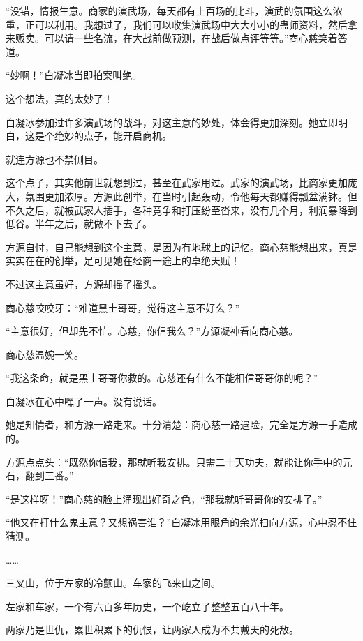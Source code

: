 
\begin{this_body}

“没错，情报生意。商家的演武场，每天都有上百场的比斗，演武的氛围这么浓重，正可以利用。我想过了，我们可以收集演武场中大大小小的蛊师资料，然后拿来贩卖。可以请一些名流，在大战前做预测，在战后做点评等等。”商心慈笑着答道。

“妙啊！”白凝冰当即拍案叫绝。

这个想法，真的太妙了！

白凝冰参加过许多演武场的战斗，对这主意的妙处，体会得更加深刻。她立即明白，这是个绝妙的点子，能开启商机。

就连方源也不禁侧目。

这个点子，其实他前世就想到过，甚至在武家用过。武家的演武场，比商家更加庞大，氛围更加浓厚。方源此创举，在当时引起轰动，令他每天都赚得瓢盆满钵。但不久之后，就被武家人插手，各种竞争和打压纷至沓来，没有几个月，利润暴降到低谷。半年之后，就做不下去了。

方源自忖，自己能想到这个主意，是因为有地球上的记忆。商心慈能想出来，真是实实在在的创举，足可见她在经商一途上的卓绝天赋！

不过这主意虽好，方源却摇了摇头。

商心慈咬咬牙：“难道黑土哥哥，觉得这主意不好么？”

“主意很好，但却先不忙。心慈，你信我么？”方源凝神看向商心慈。

商心慈温婉一笑。

“我这条命，就是黑土哥哥你救的。心慈还有什么不能相信哥哥你的呢？”

白凝冰在心中嘿了一声。没有说话。

她是知情者，和方源一路走来。十分清楚：商心慈一路遇险，完全是方源一手造成的。

方源点点头：“既然你信我，那就听我安排。只需二十天功夫，就能让你手中的元石，翻到三番。”

“是这样呀！”商心慈的脸上涌现出好奇之色，“那我就听哥哥你的安排了。”

“他又在打什么鬼主意？又想祸害谁？”白凝冰用眼角的余光扫向方源，心中忍不住猜测。

……

三叉山，位于左家的冷颤山。车家的飞来山之间。

左家和车家，一个有六百多年历史，一个屹立了整整五百八十年。

两家乃是世仇，累世积累下的仇恨，让两家人成为不共戴天的死敌。


\end{this_body}
